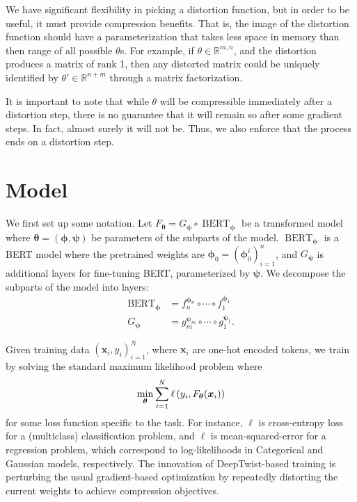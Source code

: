 \documentclass[10pt]{article}
\newcommand{\bert}{\operatorname{BERT}}
\newcommand{\btheta}{{\bm{\theta}}}
\newcommand{\bphi}{{\bm{\phi}}}
\newcommand{\bpsi}{{\bm{\psi}}}
\begin{document}
We have significant flexibility in picking a distortion function, but in order
to be useful, it must provide compression benefits. That is, the image of the
distortion function should have a parameterization that takes less space in
memory than then range of all possible $\theta$s. For example, if $\theta \in
\mathbb{R}^{m,n}$, and the distortion produces a matrix of rank 1, then any
distorted matrix could be uniquely identified by $\theta' \in \mathbb{R}^{n+m}$
through a matrix factorization.

It is important to note that while $\theta$ will be compressible immediately
after a distortion step, there is no guarantee that it will remain so after some
gradient steps. In fact, almost surely it will not be. Thus, we also enforce
that the process ends on a distortion step.

\section{Model}
\label{sec:model}

We first set up some notation. Let $F_\btheta = G_\bpsi \circ \bert_\bphi$ be
a transformed model where $\btheta = (\bphi, \bpsi)$ be parameters of the
subparts of the model. $\bert_\bphi$ is a BERT model where the pretrained
weights are $\bphi_0 = (\bphi_0^i)_{i=1}^n$, and $G_\bpsi$ is additional
layers for fine-tuning BERT, parameterized by $\bpsi$. We decompose the
subparts of the model into layers: \begin{align*}
\bert_\bphi &= f_{n}^{\bphi_n} \circ \cdots \circ f_1^{\bphi_1} \\
G_\bpsi &= g_{m}^{\bpsi_m} \circ \cdots \circ g_1^{\bpsi_1}.
\end{align*}



Given training data $(\bm x_i, y_i)_{i=1}^N$, where $\bm x_i$ are one-hot
encoded tokens, we train by solving the standard maximum likelihood problem
where \[
\min_{\btheta} \sum_{i=1}^N \ell\pr{y_i, F_\btheta(\bm x_i)}
\]
for some loss function specific to the task. For instance, $\ell$ is
cross-entropy loss for a (multiclass) classification problem, and $\ell$ is
mean-squared-error for a regression problem, which correspond to
log-likelihoods in Categorical and Gaussian models, respectively. The
innovation of DeepTwist-based training is perturbing the usual gradient-based
optimization by repeatedly distorting the current weights to achieve
compression objectives.
\end{document}
